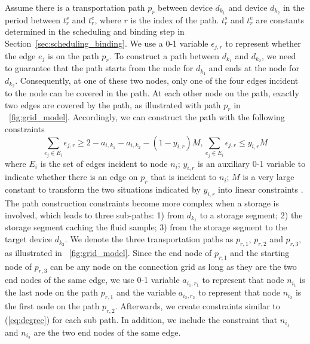 Assume there is a transportation path $p_r$ between
device $d_{k_1}$ and device $d_{k_2}$ in the period between
$t^s_{r}$ and ${t^e_{r}}$, where $r$ is the index of the path.
$t^s_{r}$ and ${t^e_{r}}$ are constants determined in the
scheduling and binding step in Section~\ref{sec:scheduling_binding}.
We use a 0-1 variable $\epsilon_{j,r}$ to represent whether the edge
$e_j$ is on the path $p_r$.
To construct a path between $d_{k_1}$ and $d_{k_2}$, we need to
guarantee that the path starts from the node for $d_{k_1}$
and ends at the node for $d_{k_2}$.
Consequently, at one of these two nodes, only one of the four edges incident
to the node can be covered in the path.
At each other node on the path, exactly two edges are covered by the path, as
illustrated with path $p_r$ in \figname~\ref{fig:grid_model}.
Accordingly, we can
construct the path with the following constraints
\begin{equation}\label{eq:degree}
\sum_{e_j\in E_i}{\epsilon_{j,r}}\ge 2-a_{i, k_1}-a_{i, k_2}-(1-y_{i,r})M,
\sum_{e_j\in E_i}{\epsilon_{j,r}}\le y_{i,r}M
\end{equation}
where $E_i$ is the set of edges incident to node $n_i$; $y_{i,r}$ is an
auxiliary 0-1 variable to indicate
whether there is an edge on $p_r$ that is incident to $n_i$;
$M$ is a very large constant to transform the two
situations indicated by $y_{i,r}$ into linear constraints
\cite{chen2011applied}.
The path construction constraints become more complex when a storage is involved,
            which leads to three sub-paths: 1) from $d_{k_1}$ to a storage segment; 2)
            the storage segment caching the fluid sample; 3) from the storage segment to the
            target device $d_{k_2}$.
            We denote the three transportation paths as $p_{r, 1}$,
            $p_{r, 2}$ and $p_{r,3}$, as illustrated in \figname~\ref{fig:grid_model}.
            Since the end node of $p_{r,1}$ and the starting
            node of $p_{r, 3}$ can be any node on the connection grid as long as they are
            the two end nodes of the same edge,
            we use 0-1 variable $a_{i_1,r_1}$ to represent that node
            $n_{i_1}$ is the last node on the path $p_{r,1}$ and the
            variable $a_{i_2,r_2}$ to represent that node
            $n_{i_2}$ is the first node on the path $p_{r,2}$.
            Afterwards, we create constraints similar to (\ref{eq:degree}) for each
            sub path. In addition, we include the constraint that $n_{i_1}$ and $n_{i_2}$
            are the two end nodes of the same edge.

